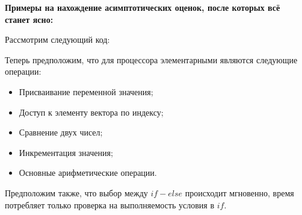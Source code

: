 \textbf{Примеры на нахождение асимптотических оценок, после которых всё станет ясно:}

Рассмотрим следующий код:
\lstset{language=C++, keepspaces = true, extendedchars=\false}


Теперь предположим, что для процессора элементарными являются следующие операции:
\begin{itemize}
    \item Присваивание переменной значения;
    \item Доступ к элементу вектора по индексу;
    \item Сравнение двух чисел;
    \item Инкрементация значения;
    \item Основные арифметические операции.
\end{itemize}
Предположим также, что выбор между $if-else$ происходит мгновенно, время потребляет только проверка на выполняемость условия в $if$.

